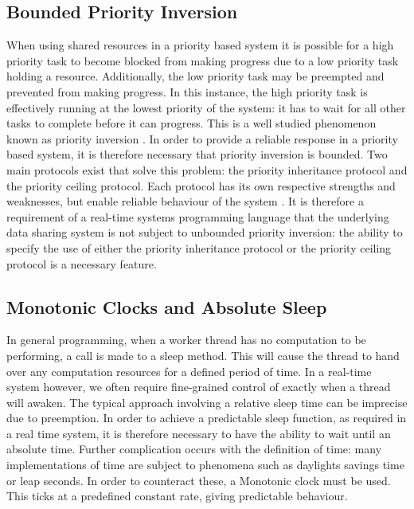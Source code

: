 \subsection{Bounded Priority Inversion}
When using shared resources in a priority based system it is possible for 
a high priority task to become blocked from making progress due to a low
priority task holding a resource. Additionally, the low priority task may be 
preempted and prevented from making progress. In this instance, the high priority task is 
effectively running at the lowest priority of the system: it has to wait for all other 
tasks to complete before it can progress. This is a well studied phenomenon known 
as priority inversion 
\cite{real-time-systems}. 
In order to provide a reliable response in a priority based system, it is 
therefore necessary that priority inversion is bounded.
Two main protocols exist that solve this problem: the priority inheritance protocol 
and the priority ceiling protocol. Each protocol has its own respective 
strengths and weaknesses, but enable reliable behaviour of the system 
\cite{mall2009real}.
It is therefore a requirement of a real-time systems programming language 
that the underlying data sharing system is not subject to unbounded priority 
inversion: the ability to specify the use of either the priority inheritance 
protocol or the priority ceiling protocol is a necessary feature.  

\subsection{Monotonic Clocks and Absolute Sleep}
In general programming, when a worker thread has no computation to be 
performing, a call is made to a sleep method. This will cause the thread
to hand over any computation resources for a defined period of time. In a 
real-time system however, we often require fine-grained control of exactly
when a thread will awaken. The typical approach involving a relative sleep 
time can be imprecise due to preemption. In order to achieve a predictable 
sleep function, as required in a real time system, it is therefore necessary 
to have the ability to wait until an absolute time. Further complication 
occurs with the definition of time: many implementations of time are subject 
to phenomena such as daylights savings time or leap seconds. 
In order to counteract these, a Monotonic clock must be used. This ticks at a 
predefined constant rate, giving predictable behaviour. 

